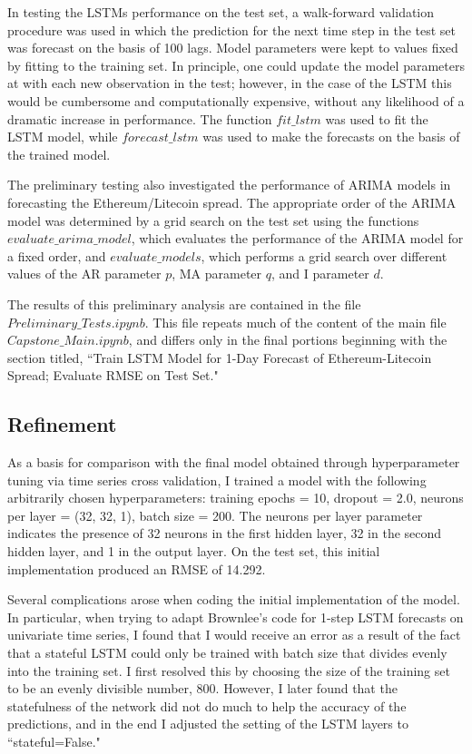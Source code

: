 \documentclass{article}
\begin{document}
In testing the LSTMs performance on the test set, a walk-forward validation procedure was used in which the prediction for the next time step in the test set was forecast on the basis of 100 lags. Model parameters were kept to values fixed by fitting to the training set. In principle, one could update the model parameters at with each new observation in the test; however, in the case of the LSTM this would be cumbersome and computationally expensive, without any likelihood of a dramatic increase in performance. The function $fit\_lstm$ was used to fit the LSTM model, while $forecast\_lstm$ was used to make the forecasts on the basis of the trained model. 

The preliminary testing also investigated the performance of ARIMA models in forecasting the Ethereum/Litecoin spread. The appropriate order of the ARIMA model was determined by a grid search on the test set using the functions $evaluate\_arima\_model$, which evaluates the performance of the ARIMA model for a fixed order, and $evaluate\_models$, which performs a grid search over different values of the AR parameter $p$, MA parameter $q$, and I parameter $d$. 

The results of this preliminary analysis are contained in the file $Preliminary\_Tests.ipynb$. This file repeats much of the content of the main file $Capstone\_Main.ipynb$, and differs only in the final portions beginning with the section titled, ``Train LSTM Model for 1-Day Forecast of Ethereum-Litecoin Spread; Evaluate RMSE on Test Set."


\subsection{Refinement}

As a basis for comparison with the final model obtained through hyperparameter tuning via time series cross validation, I trained a model with the following arbitrarily chosen hyperparameters: training epochs = 10, dropout = 2.0, neurons per layer = (32, 32, 1), batch size = 200. The neurons per layer parameter indicates the presence of 32 neurons in the first hidden layer, 32 in the second hidden layer, and 1 in the output layer. On the test set, this initial implementation produced an RMSE of 14.292. 


Several complications arose when coding the initial implementation of the model. In particular, when trying to adapt Brownlee's code for 1-step LSTM forecasts on univariate time series, I found that I would receive an error as a result of the fact that a stateful LSTM could only be trained with batch size that divides evenly into the training set. I first resolved this by choosing the size of the training set to be an evenly divisible number, 800. However, I later found that the statefulness of the network did not do much to help the accuracy of the predictions, and in the end I adjusted the setting of the LSTM layers to ``stateful=False." 
\end{document}
